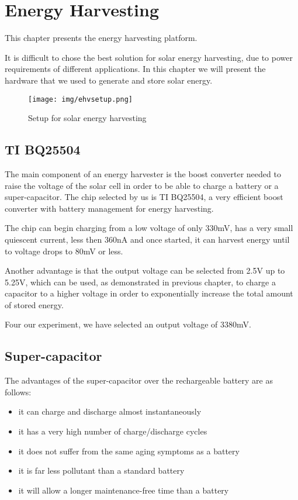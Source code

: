 \normalfont\normalsize
\chapter{Energy Harvesting}

This chapter presents the energy harvesting platform.

It is difficult to chose the best solution for solar energy harvesting, due to power requirements
of different applications. In this chapter we will present the hardware that we used to generate
and store solar energy.

\begin{figure}[ht] \centering
\texttt{[image: img/ehvsetup.png]}
\caption{Setup for solar energy harvesting}
\end{figure}

\section{TI BQ25504}
The main component of an energy harvester is the boost converter needed to raise the voltage of the
solar cell in order to be able to charge a battery or a super-capacitor. The chip selected by us is
TI BQ25504, a very efficient boost converter with battery management for energy harvesting.

The chip can begin charging from a low voltage of only 330mV, has a very small quiescent current,
less then 360nA and once started, it can harvest energy until to voltage drops to 80mV or less.

Another advantage is that the output voltage can be selected from 2.5V up to 5.25V, which can be
used, as demonstrated in previous chapter, to charge a capacitor to a higher voltage in order
to exponentially increase the total amount of stored energy.

Four our experiment, we have selected an output voltage of 3380mV.

\section{Super-capacitor}
The advantages of the super-capacitor over the rechargeable battery are as follows:

\begin{itemize}
\item it can charge and discharge almost instantaneously
\item it has a very high number of charge/discharge cycles
\item it does not suffer from the same aging symptoms as a battery
\item it is far less pollutant than a standard battery
\item it will allow a longer maintenance-free time than a battery

\end{itemize}

